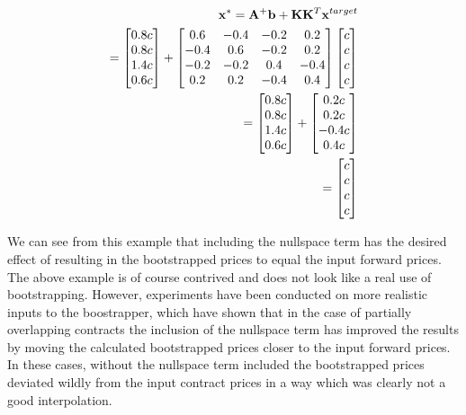\documentclass{article}
\begin{document}
\begin{eqnarray}
    \nonumber
    \mathbf{x}^* = \mathbf{A}^+ \mathbf{b} + \mathbf{K} \mathbf{K}^T \mathbf{x}^{target} \\
    \nonumber
    = \begin{bmatrix}
        0.8c \\
        0.8c \\
        1.4c \\
        0.6c \\
    \end{bmatrix} +
    \begin{bmatrix}
        0.6 & -0.4 & -0.2 & 0.2  \\
        -0.4 & 0.6 & -0.2 & 0.2 \\
        -0.2 & -0.2 & 0.4 & -0.4 \\
        0.2 & 0.2 & -0.4 & 0.4
    \end{bmatrix}
    \begin{bmatrix}
        c \\
        c \\
        c \\
        c \\
    \end{bmatrix} \\
    \nonumber
    = \begin{bmatrix}
        0.8c \\
        0.8c \\
        1.4c \\
        0.6c \\
    \end{bmatrix} +
    \begin{bmatrix}
        0.2c \\
        0.2c \\
        -0.4c \\
        0.4c \\
    \end{bmatrix} \\
    = \begin{bmatrix}
        c \\
        c \\
        c \\
        c \\
    \end{bmatrix}
\end{eqnarray}

We can see from this example that including the nullspace term has the desired effect
of resulting in the bootstrapped prices to equal the input forward prices. The above
example is of course contrived and does not look like a real use of bootstrapping.
However, experiments have been conducted on more realistic inputs to the boostrapper,
which have shown that in the case of partially overlapping contracts the inclusion of
the nullspace term has improved the results by moving the calculated bootstrapped prices 
closer to the input forward prices. In these cases, without the nullspace term included
the bootstrapped prices deviated wildly from the input contract prices in a way which was
clearly not a good interpolation.
\end{document}
